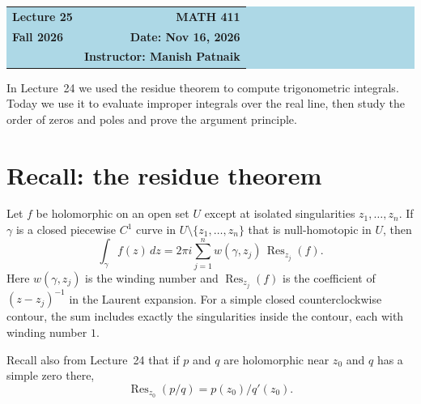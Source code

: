 \documentclass[11pt]{article}
\theoremstyle{plain}
\theoremstyle{definition}
\theoremstyle{remark}
\numberwithin{equation}{section}
\begin{document}
\begin{center}
  \colorbox{lightblue}{%
    \begin{minipage}{0.94\textwidth}
      \vspace{0.55em}
      \begin{tabular*}{\textwidth}{@{\extracolsep{\fill}}lr}
        {\color{courseblue}\bfseries\LARGE Lecture 25} &
        {\color{courseblue}\bfseries\LARGE MATH 411}\\[0.35em]
        \textbf{Fall 2026} & \textbf{Date: Nov 16, 2026}\\
        & \textbf{Instructor: Manish Patnaik}
      \end{tabular*}
      \vspace{0.45em}
    \end{minipage}}
\end{center}

\setcounter{tocdepth}{1}
\tableofcontents
\vspace{0.45em}

In Lecture~24 we used the residue theorem to compute trigonometric
integrals. Today we use it to evaluate improper integrals over the real
line, then study the order of zeros and poles and prove the argument
principle.

\section{Recall: the residue theorem}
Let $f$ be holomorphic on an open set $U$ except at isolated singularities
$z_1,\dots,z_n$. If $\gamma$ is a closed piecewise $C^1$ curve in
$U\setminus\{z_1,\dots,z_n\}$ that is null-homotopic in $U$, then
\[
 \int_\gamma f(z)\,dz=2\pi i\sum_{j=1}^{n}
 w(\gamma,z_j)\,\operatorname{Res}_{z_j}(f).
\]
Here $w(\gamma,z_j)$ is the winding number and $\operatorname{Res}_{z_j}(f)$
is the coefficient of $(z-z_j)^{-1}$ in the Laurent expansion. For a simple
closed counterclockwise contour, the sum includes exactly the singularities
inside the contour, each with winding number $1$.


Recall also from Lecture~24
that if $p$ and $q$ are holomorphic near $z_0$ and $q$ has a simple zero
there,  $$\operatorname{Res}_{z_0}(p/q)=p(z_0)/q'(z_0).$$
\end{document}
